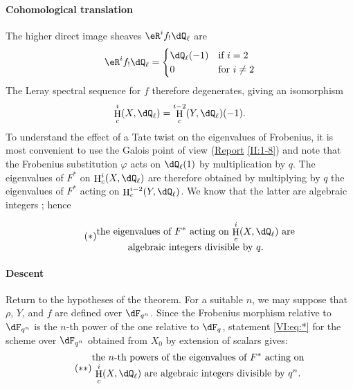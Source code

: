 \documentclass[oneside]{book}
\DeclareMathOperator{\h}{H}
\theoremstyle{sga-source}
\theoremstyle{sga-source-dash}
\theoremstyle{sga-source-dotdash}
\theoremstyle{sga-source-number-note-dash}
\theoremstyle{sga-source-note-number-dotdash}
\theoremstyle{sga-source-example-dotdash}
\theoremstyle{sga-source-inline-number}
\theoremstyle{sga-source-bare-number}
\theoremstyle{sga-source}
\begin{document}
\paragraph{Cohomological translation}
The higher direct image sheaves $\eR^i f_!\dQ_\ell$ are 
\[
  \eR^i f_!\dQ_\ell = \begin{cases}
                       \dQ_\ell(-1) & \text{if $i = 2$} \\
                       0            & \text{for $i\ne 2$}
                     \end{cases}
\]
The Leray spectral sequence for $f$ therefore degenerates, giving an isomorphism 
\[
  \h_c^i(X,\dQ_\ell) = \h_c^{i-2}(Y,\dQ_\ell)(-1) \text{.}
\]
To understand the effect of a Tate twist on the eigenvalues of 
Frobenius, it is most convenient to use the Galois point of view 
(\hyperref[II]{Report} \ref{II:1-8}) and note that the Frobenius substitution 
$\varphi$ acts on $\dQ_\ell(1)$ by multiplication by $q$. The 
eigenvalues of $F^\ast$ on $\var{\h_c^p(X,\dQ_\ell)}{\h_c^i(X,\dQ_\ell)}{S45-SOL-0696}$ are therefore obtained by 
multiplying by $q$ the eigenvalues of $F^\ast$ acting on $\h_c^{i-2}(Y,\dQ_\ell)$. We 
know that the latter are algebraic integers \cite[XXI 5.2.2]{sga7}; hence 

\begin{equation*}\tag{$*$}\label{VI:eq:*}
  \substack{\displaystyle\text{the eigenvalues of $F^\ast$ acting on $\h_c^i(X,\dQ_\ell)$ are} \\
  \displaystyle\text{algebraic integers divisible by $q$.}}
\end{equation*}


\paragraph{Descent}
Return to the hypotheses of the theorem. For a suitable $n$, we may 
suppose that $\rho$, $Y$, and $f$ are defined over $\dF_{q^n}$. Since the 
Frobenius morphism relative to $\dF_{q^n}$ is the $n$-th power of the one 
relative to $\dF_q$, statement \eqref{VI:eq:*} for the scheme over 
$\dF_{q^n}$ obtained from $X_0$ by extension of scalars gives: 
\begin{equation*}\tag{$**$}\label{VI:eq:**}
  \substack{\displaystyle\text{the $n$-th powers of the eigenvalues of $F^\ast$ acting on} \\ \displaystyle\text{$\h_c^i(X,\dQ_\ell)$ are algebraic integers divisible by $q^n$.}}
\end{equation*}
\end{document}
